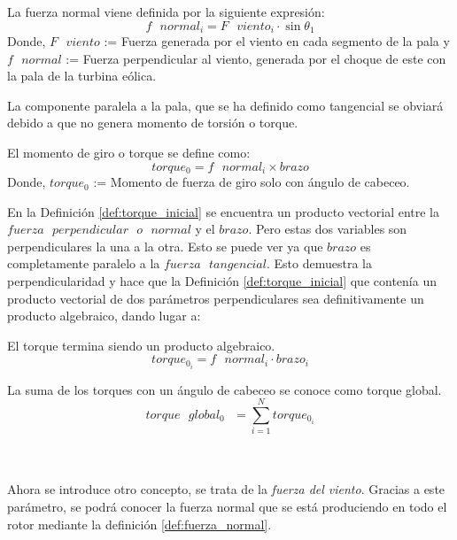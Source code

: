  \begin{definicion}
 La fuerza normal viene definida por la siguiente expresión:
  $$ f \text{ } normal_i = F \text{ } viento_i \cdot \sin{\theta_1}$$
Donde,
\centering $F \text{ } viento$ := Fuerza generada por el viento en cada segmento de la pala y $f \text{ } normal$ := Fuerza perpendicular al viento, generada por el choque de este con la pala de la turbina eólica.
 \label{def:fuerza_normal}
 \end{definicion}
 
  La componente paralela a la pala, que se ha definido como tangencial se obviará debido a que no genera momento de torsión o torque. 
  
  \begin{definicion}
El momento de giro o torque se define como:
 $$ torque_0 = f \text{ } normal_i \times brazo$$
Donde,
\centering $torque_0$ := Momento de fuerza de giro solo con ángulo de cabeceo.
  \label{def:torque_inicial}
 \end{definicion}
 

 En la Definición \ref{def:torque_inicial} se encuentra un producto vectorial entre la $fuerza  \text{ }perpendicular \text{ } o \text{ } normal$ y el $brazo$. Pero estas dos variables son perpendiculares la una a la otra. Esto se puede ver ya que $brazo$ es completamente paralelo a la $fuerza \text{ } tangencial$. Esto demuestra la perpendicularidad y hace que la Definición \ref{def:torque_inicial} que contenía un producto vectorial de dos parámetros perpendiculares sea definitivamente un producto algebraico, dando lugar a:
 
 
  \begin{definicion}
  El torque termina siendo un producto algebraico.
 $$ torque_{0_i} = f \text{ } normal_i \cdot brazo_i$$
 \label{def:torque_algebraico_inicial}
 \end{definicion}
 
 
 \begin{definicion}
 La suma de los torques con un ángulo de cabeceo se conoce como torque global.
 $$ torque \text{ } global_0 \text{ } = \sum_{i=1}^{N} torque_0_{i} $$
\label{def:torque_global}
\end{definicion}
 
 \\\\Ahora se introduce otro concepto, se trata de la \textit{fuerza del viento}. Gracias a este parámetro, se podrá conocer la fuerza normal que se está produciendo en todo el rotor mediante la definición \ref{def:fuerza_normal}.
 
